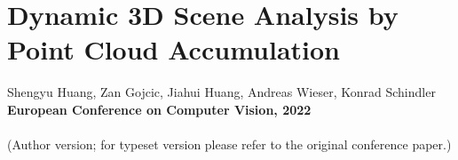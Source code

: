 \chapter[Dynamic 3D Scene Analysis by Point Cloud Accumulation]{Dynamic 3D Scene Analysis by Point Cloud Accumulation}
\label{chap:eccv22}

Shengyu Huang, Zan Gojcic, Jiahui Huang, Andreas Wieser, Konrad Schindler\\
\textbf{European Conference on Computer Vision, 2022}\\
\\
(Author version; for typeset version please refer to the original conference paper.)\\

\providecommand{\subdir}{.}
\graphicspath{{\subdir/}}



\newpage









\newpage
